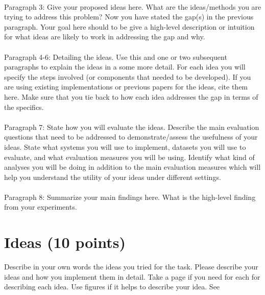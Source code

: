 \documentclass[11pt,a4paper]{article}
\begin{document}
\paragraph{}Paragraph 3: Give your proposed ideas here. What are the ideas/methods you are trying to address this problem? Now you have stated the gap(s) in the previous paragraph.
Your goal here should to be give a high-level description or intuition for what ideas are likely to work in addressing the gap and why. 

\paragraph{}Paragraph 4-6: Detailing the ideas. Use this and one or two subsequent paragraphs to explain the ideas in a some more detail. For each idea you will specify the steps involved (or components that needed to be developed).
If you are using existing implementations or previous papers for the ideas, cite them here. Make sure that you tie back to how each idea addresses the gap in terms of the specifics. 

\paragraph{}Paragraph 7: State how you will evaluate the ideas. Describe the main evaluation questions that need to be addressed to demonstrate/assess the usefulness of your ideas. 
State what systems you will use to implement, datasets you will use to evaluate, and what evaluation measures you will be using. Identify what kind of analyses you will be doing in addition to the main 
evaluation measures which will help you understand the utility of your ideas under different settings. 

\paragraph{}Paragraph 8: Summarize your main findings here. What is the high-level finding from your experiments.


\section{Ideas (10 points)}
Describe in your own words the ideas you tried for the task. Please describe your ideas and how you implement them in detail. Take a page if you need for each for describing each idea. Use figures if it helps to describe your idea. See  
\end{document}
